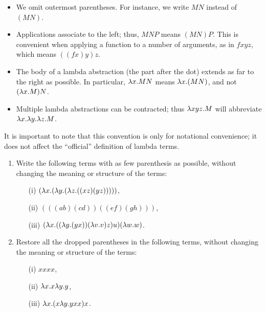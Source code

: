 \documentclass{article}
\begin{document}
\begin{convention}
  \begin{itemize}
  \item We omit outermost parentheses. For instance, we write $MN$
    instead of $(MN)$.
  \item Applications associate to the left; thus, $MNP$ means
    $(MN)P$. This is convenient when applying a function to a number
    of arguments, as in $fxyz$, which means $((fx)y)z$. 
  \item The body of a lambda abstraction (the part after the dot)
    extends as far to the right as possible. In particular, $\lambda
    x.MN$ means $\lambda x.(MN)$, and not $(\lambda x.M)N$. 
  \item Multiple lambda abstractions can be contracted; thus $\lambda
    xyz.M$ will abbreviate $\lambda x.\lambda y.\lambda z.M$.
  \end{itemize}
\end{convention}  

It is important to note that this convention is only for notational
convenience; it does not affect the ``official'' definition of lambda
terms.

\begin{exercise}
  \begin{enumerate}\alphalabels
  \item Write the following terms with as few parenthesis as possible,
    without changing the meaning or structure of the terms: 
    \begin{enumerate}
    \item[(i)] $(\lambda x.(\lambda y.(\lambda z.((xz)(yz)))))$, 
    \item[(ii)] $(((ab)(cd))((ef)(gh)))$, 
    \item[(iii)] $(\lambda x.((\lambda y.(yx))(\lambda v.v)z)u)(\lambda w.w)$.
    \end{enumerate}
  \item Restore all the dropped parentheses in the following terms,
    without changing the meaning or structure of the terms: 
    \begin{enumerate}
    \item[(i)] $xxxx$, 
    \item[(ii)] $\lambda x.x\lambda y.y$, 
    \item[(iii)] $\lambda x.(x\lambda y.yxx)x$.
    \end{enumerate}
  \end{enumerate}
\end{exercise}

\end{document}
